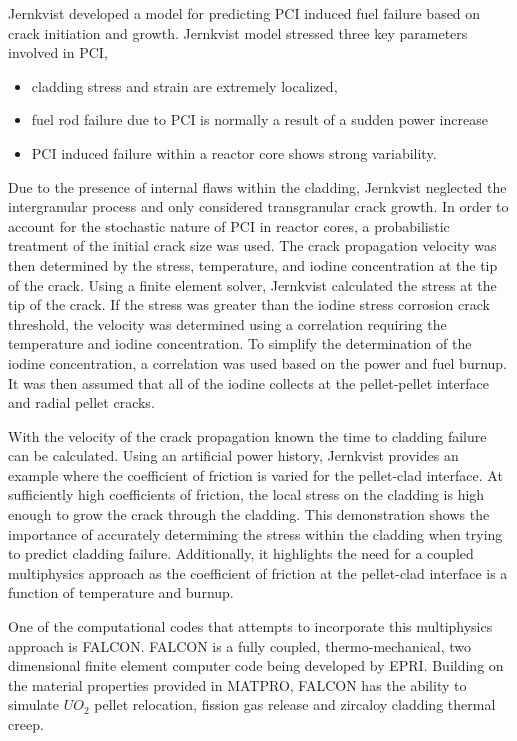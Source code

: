 \documentclass[edeposit,fullpage,11pt]{uiucthesis2009}
\begin{document}
Jernkvist \cite{jernkvist_model_1995} developed a model for predicting \gls{PCI} induced fuel failure based on crack initiation and growth.
Jernkvist model stressed three key parameters involved in \gls{PCI},
\begin{itemize} 
\item cladding stress and strain are extremely localized, 
\item fuel rod failure due to \gls{PCI} is normally a result of a sudden power increase 
\item \gls{PCI} induced failure within a reactor core shows strong variability.
\end{itemize}
Due to the presence of internal flaws within the cladding, Jernkvist neglected the intergranular process and only considered transgranular crack growth.
In order to account for the stochastic nature of \gls{PCI} in reactor cores, a probabilistic treatment of the initial crack size was used.
The crack propagation velocity was then determined by the stress, temperature, and iodine concentration at the tip of the crack.
Using a finite element solver, Jernkvist calculated the stress at the tip of the crack.
If the stress was greater than the iodine stress corrosion crack threshold, the velocity was determined using a correlation requiring the temperature and iodine concentration.
To simplify the determination of the iodine concentration, a correlation was used based on the power and fuel burnup.
It was then assumed that all of the iodine collects at the pellet-pellet interface and radial pellet cracks.

With the velocity of the crack propagation known the time to cladding failure can be calculated.
Using an artificial power history, Jernkvist provides an example where the coefficient of friction is varied for the pellet-clad interface.
At sufficiently high coefficients of friction, the local stress on the cladding is high enough to grow the crack through the cladding.
This demonstration shows the importance of accurately determining the stress within the cladding when trying to predict cladding failure.
Additionally, it highlights the need for a coupled multiphysics approach as the coefficient of friction at the pellet-clad interface is a function of temperature and burnup.

One of the computational codes that attempts to incorporate this multiphysics approach is FALCON. %
FALCON is a fully coupled, thermo-mechanical, two dimensional finite element computer code being developed by \gls{EPRI}.
Building on the material properties provided in MATPRO, FALCON has the ability to simulate $UO_2$ pellet relocation, fission gas release and zircaloy cladding thermal creep.
\end{document}
